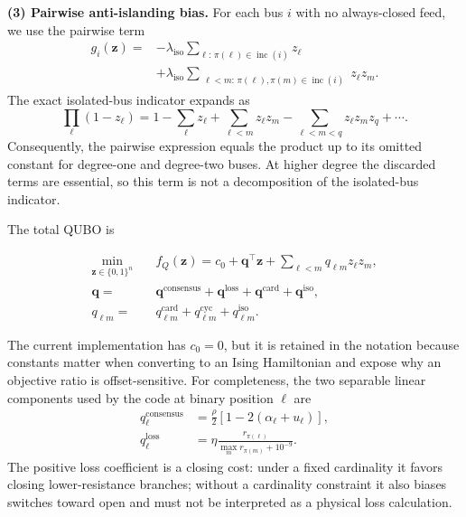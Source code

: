 \documentclass[5p,twocolumn,number,sort&compress,nopreprintline]{elsarticle}
\begin{document}
\medskip
\noindent\textbf{(3) Pairwise anti-islanding bias.}
For each bus $i$ with no always-closed feed, we use the pairwise term
\begin{equation}
\begin{aligned}
g_i(\boldsymbol z)={}&-\lambda_{\text{iso}}
  \sum_{\ell:\,\pi(\ell)\in \operatorname{inc}(i)} z_\ell\\
&+\lambda_{\text{iso}}
  \sum_{\substack{\ell<m:\,\pi(\ell),\pi(m)\in
  \operatorname{inc}(i)}} z_\ell z_m.
\end{aligned}
\end{equation}
The exact isolated-bus indicator expands as
\begin{equation}
\prod_\ell(1-z_\ell)=1-\sum_\ell z_\ell
+\sum_{\ell<m}z_\ell z_m
-\sum_{\ell<m<q}z_\ell z_m z_q+\cdots .
\end{equation}
Consequently, the pairwise expression equals the product up to its
omitted constant for degree-one and degree-two buses. At higher degree the
discarded terms are essential, so this term is not a decomposition of
the isolated-bus indicator.

The total QUBO is

\begin{equation}\label{eq:qubo}
\begin{aligned}
\min_{\boldsymbol z\in\{0,1\}^n}\quad
&f_Q(\boldsymbol z)
=c_0+\boldsymbol q^\top\boldsymbol z
+\sum_{\ell<m}q_{\ell m}z_\ell z_m,\\
\boldsymbol q={}&\boldsymbol q^{\text{consensus}}
+\boldsymbol q^{\text{loss}}+\boldsymbol q^{\text{card}}
+\boldsymbol q^{\text{iso}},\\
q_{\ell m}={}&q_{\ell m}^{\text{card}}
+q_{\ell m}^{\text{cyc}}+q_{\ell m}^{\text{iso}}.
\end{aligned}
\end{equation}

The current implementation has $c_0=0$, but it is retained in the
notation because constants matter when converting to an Ising
Hamiltonian and expose why an objective ratio is offset-sensitive.
For completeness, the two separable linear components used by the code
at binary position $\ell$ are
\begin{align}
q_\ell^{\mathrm{consensus}}
&=\frac{\rho}{2}\!\left[1-2(\alpha_\ell+u_\ell)\right],\\
q_\ell^{\mathrm{loss}}
&=\eta\frac{r_{\pi(\ell)}}{\max_m r_{\pi(m)}+10^{-9}} .
\end{align}
The positive loss coefficient is a closing cost: under a fixed
cardinality it favors closing lower-resistance branches; without a
cardinality constraint it also biases switches toward open and must not
be interpreted as a physical loss calculation.
\end{document}
